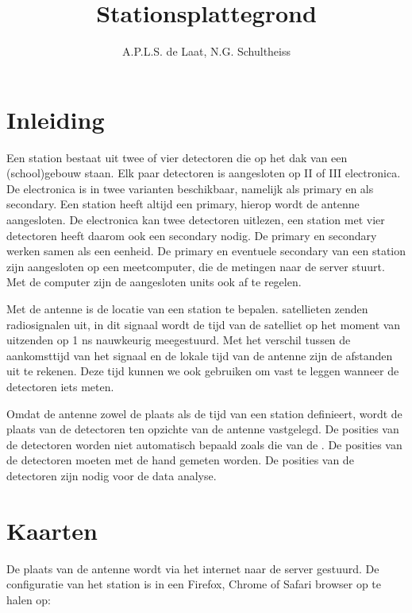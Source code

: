 

\title{Stationsplattegrond}
\author{A.P.L.S. de Laat, N.G. Schultheiss}



\maketitle

\section{Inleiding}

Een \hisparc station bestaat uit twee of vier detectoren die op het dak van een
(school)gebouw staan. Elk paar detectoren is aangesloten op \hisparc II of
\hisparc III electronica. De \hisparc electronica is in twee varianten
beschikbaar, namelijk als primary en als secondary. Een \hisparc station heeft
altijd een \hisparc primary, hierop wordt de \gps antenne aangesloten. De
electronica kan twee detectoren uitlezen, een station met vier detectoren heeft
daarom ook een secondary nodig. De primary en secondary werken samen als een eenheid. De
primary en eventuele secondary van een station zijn aangesloten op een meetcomputer,
die de metingen naar de \hisparc server stuurt. Met de computer zijn de
aangesloten units ook af te regelen.

Met de \gps antenne is de locatie van een station te bepalen.
\gps satellieten zenden radiosignalen uit, in dit signaal wordt de tijd
van de satelliet op het moment van uitzenden op 1 ns nauwkeurig meegestuurd.
Met het verschil tussen de aankomsttijd van het signaal en de lokale
tijd van de antenne zijn de afstanden uit te rekenen. Deze tijd kunnen we
ook gebruiken om  vast te leggen wanneer de detectoren iets meten.

Omdat de \gps antenne zowel de plaats als de tijd van een station definieert,
wordt de plaats van de detectoren ten opzichte van de \gps antenne vastgelegd.
De posities van de detectoren worden niet automatisch bepaald zoals die van de
\gps. De posities van de detectoren moeten met de hand gemeten worden. De
posities van de detectoren zijn nodig voor de data analyse.


\section{Kaarten}

De plaats van de \gps antenne wordt via het internet naar de \hisparc
server gestuurd. De configuratie van het station is in een Firefox,
Chrome of Safari browser op te halen op:

